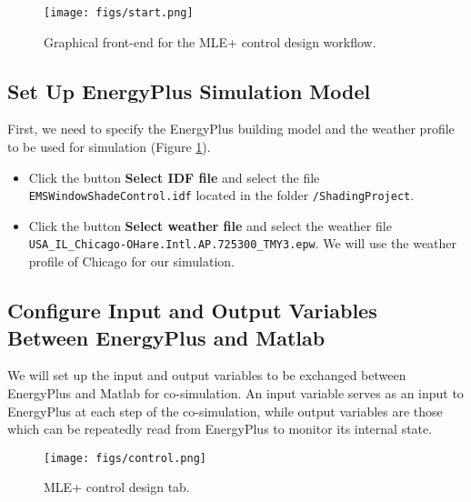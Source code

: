 \documentclass[11pt]{article}
\begin{document}
\begin{figure}[htb]
\centering
\texttt{[image: figs/start.png]}
\caption{\label{fig:startupgui}Graphical front-end for the MLE+ control design workflow.}
\end{figure}



\subsection{Set Up EnergyPlus Simulation Model}
\label{sec-4-3}

First, we need to specify the EnergyPlus building model and the
weather profile to be used for simulation (Figure \ref{fig:startupgui}).
\begin{itemize}
\item Click the button \textbf{Select IDF file} and select the file
\texttt{EMSWindowShadeControl.idf} located in the folder \texttt{/ShadingProject}.
\item Click the button \textbf{Select weather file} and select the weather file
\texttt{USA\_IL\_Chicago-OHare.Intl.AP.725300\_TMY3.epw}.  We will use the
weather profile of Chicago for our simulation.
\end{itemize}


\subsection{Configure Input and Output Variables Between EnergyPlus and Matlab}
\label{sec-4-4}

We will set up the input and output variables to be exchanged between
EnergyPlus and Matlab for co-simulation. An input variable serves as
an input to EnergyPlus at each step of the co-simulation, while output
variables are those which can be repeatedly read from EnergyPlus to
monitor its internal state.

\begin{figure}[htb]
\centering
\texttt{[image: figs/control.png]}
\caption{\label{fig:control}MLE+ control design tab.}
\end{figure}
\end{document}
